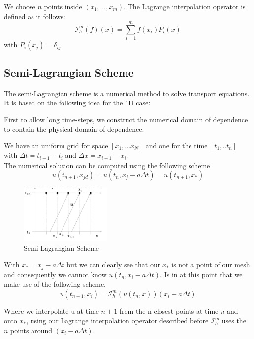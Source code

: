\documentclass{article}
\begin{document}
We choose $n$ points inside $\left(x_1, \ldots, x_m\right)$.
The Lagrange interpolation operator is defined as it follows:
$$
\mathcal{I}_h^m(f)(x)=\sum_{i=1}^m f\left(x_i\right) P_i(x)
$$
with $P_i\left(x_j\right)=\delta_{i j}$


\subsection{Semi-Lagrangian Scheme}


The semi-Lagrangian scheme is a numerical method to solve transport equations. It is based on the following idea for the 1D case:


First to allow long time-steps, we construct the numerical domain of dependence to contain the physical domain of dependence.


We have an uniform grid for space $\left[x_1, \ldots x_N\right]$ and one  for the time $\left[t_1, . . t_n\right]$ with $\Delta t=t_{i+1}-t_i$ and $\Delta x=x_{i+1}-x_i$.\\
The numerical solution can be computed using the following scheme
$$
u\left(t_{n+1}, x_{jd}\right)=u\left(t_n, x_j-a \Delta t\right)= u (t_{n+1},x_{*})
$$


\begin{figure}[!h]
\centering
\includegraphics[width=0.4\textwidth]{images/11.png}
\caption{Semi-Lagrangian Scheme}


\end{figure}


With  $x_{*}= x_{j}-a \Delta t$ but we can clearly see that our  $x_{*}$ is not a point of our mesh and consequently we cannot know $u\left(t_n, x_i-a \Delta t\right)$. Is in at this point that we make use of the following scheme.
$$
u\left(t_{n+1}, x_i\right)=\mathcal{I}_h^m\left(u\left(t_n, x\right)\right)\left(x_i-a \Delta t\right)
$$


Where we interpolate u at time $n+1$ from the n-closest points at time $n$ and onto $x_{*}$, using our Lagrange interpolation operator described before $\mathcal{I}_h^m$ uses the $n$ points around $\left(x_i-a \Delta t\right)$.\\
\end{document}
